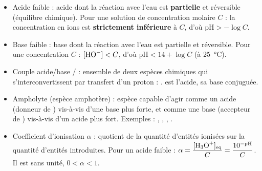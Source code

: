 \documentclass[11pt]{article}
\newcommand{\cle}[1]{{\popxbold\color{popdark}#1}}
\begin{document}
\begin{definition}
\begin{itemize}
  \item \cle{Acide faible} : acide dont la réaction avec l'eau est \textbf{partielle} et réversible (équilibre chimique). Pour une solution de concentration molaire $C$ : la concentration en ions  est \textbf{strictement inférieure} à $C$, d'où $\mathrm{pH} > -\log C$.
  \item \cle{Base faible} : base dont la réaction avec l'eau est partielle et réversible. Pour une concentration $C$ : $[\ce{HO-}] < C$, d'où $\mathrm{pH} < 14 + \log C$ (à \SI{25}{\celsius}).
  \item \cle{Couple acide/base} / : ensemble de deux espèces chimiques qui s'interconvertissent par transfert d'un proton  : .  est l'acide,  sa base conjuguée.
  \item \cle{Ampholyte} (espèce amphotère) : espèce capable d'agir comme un acide (donneur de ) vis-à-vis d'une base plus forte, et comme une base (accepteur de ) vis-à-vis d'un acide plus fort. Exemples : , , , .
  \item \cle{Coefficient d'ionisation} $\alpha$ : quotient de la quantité d'entités ionisées sur la quantité d'entités introduites. Pour un acide faible  : $\alpha = \dfrac{[\ce{H3O+}]_{\text{eq}}}{C} = \dfrac{10^{-\mathrm{pH}}}{C}$. Il est sans unité, $0 < \alpha < 1$.
\end{itemize}
\end{definition}
\end{document}
